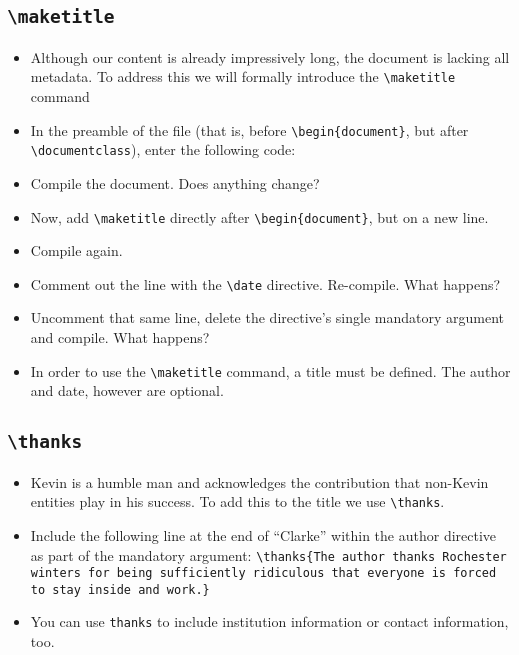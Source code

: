 \subsection*{\texttt{\textbackslash maketitle}}
\begin{itemize}
\item Although our content is already impressively long, the document
  is lacking all metadata. To address this we will formally introduce
  the \texttt{\textbackslash maketitle} command
\item In the preamble of the file (that is, before
  \texttt{\textbackslash begin\{document\}}, but after
  \texttt{\textbackslash documentclass}), enter the following code:

\item Compile the document. Does anything change?
\item Now, add \texttt{\textbackslash maketitle} directly after
  \texttt{\textbackslash begin\{document\}}, but on a new line.
\item Compile again.
\item Comment out the line with the \texttt{\textbackslash date}
  directive. Re-compile. What happens?
\item Uncomment that same line, delete the directive's single
  mandatory argument and compile. What happens?
\item In order to use the \texttt{\textbackslash maketitle} command, a
  title must be defined. The author and date, however are optional.
\end{itemize}

\subsection*{\texttt{\textbackslash thanks}}
\begin{itemize}
\item Kevin is a humble man and acknowledges the contribution that
  non-Kevin entities play in his success. To add this to the title we
  use \texttt{\textbackslash thanks}.
\item Include the following line at the end of ``Clarke'' within the
  author directive as part of the mandatory
  argument: \texttt{\textbackslash thanks\{The author thanks Rochester
    winters for being sufficiently ridiculous that everyone is forced
    to stay inside and work.\}}
\item You can use \texttt{thanks} to include institution information
  or contact information, too.
\end{itemize}



